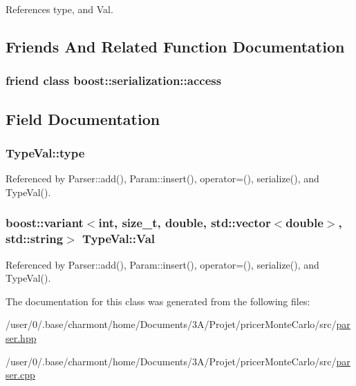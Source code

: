 References type, and Val.



\subsection{Friends And Related Function Documentation}
\hypertarget{classTypeVal_ac98d07dd8f7b70e16ccb9a01abf56b9c}{
\subsubsection[{boost\-::serialization\-::access}]{\setlength{\rightskip}{0pt plus 5cm}friend class boost\-::serialization\-::access\hspace{0.3cm}{\ttfamily [friend]}}}\label{classTypeVal_ac98d07dd8f7b70e16ccb9a01abf56b9c}


\subsection{Field Documentation}
\hypertarget{classTypeVal_abd5dd71d2a5e2ce2f3b1f018068108ff}{
\subsubsection[{type}]{ Type\-Val\-::type}}\label{classTypeVal_abd5dd71d2a5e2ce2f3b1f018068108ff}


Referenced by Parser\-::add(), Param\-::insert(), operator=(), serialize(), and Type\-Val().

\hypertarget{classTypeVal_abafd45e0ebbcb8129080cddbea3b3d7b}{
\subsubsection[{Val}]{\setlength{\rightskip}{0pt plus 5cm}boost\-::variant$<$int, size\-\_\-t, double, std\-::vector$<$double$>$, std\-::string$>$ Type\-Val\-::\-Val}}\label{classTypeVal_abafd45e0ebbcb8129080cddbea3b3d7b}


Referenced by Parser\-::add(), Param\-::insert(), operator=(), serialize(), and Type\-Val().



The documentation for this class was generated from the following files\-:\begin{DoxyCompactItemize}
\item 
/user/0/.\-base/charmont/home/\-Documents/3\-A/\-Projet/pricer\-Monte\-Carlo/src/\hyperlink{parser_8hpp}{parser.\-hpp}\item 
/user/0/.\-base/charmont/home/\-Documents/3\-A/\-Projet/pricer\-Monte\-Carlo/src/\hyperlink{parser_8cpp}{parser.\-cpp}\end{DoxyCompactItemize}

